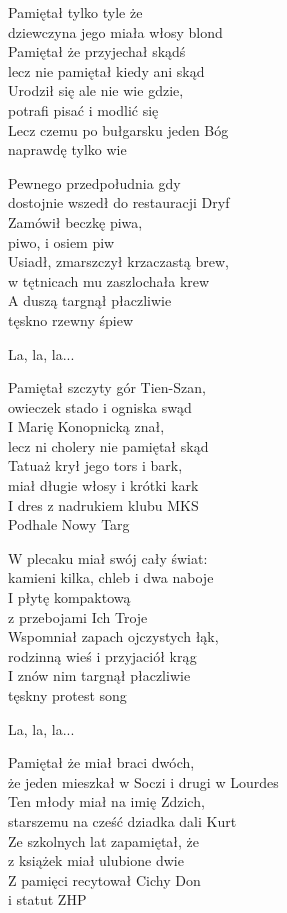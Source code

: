\begin{text}
   Pamiętał tylko tyle że\\
   dziewczyna jego miała włosy blond\\
   Pamiętał że przyjechał skądś\\
   lecz nie pamiętał kiedy ani skąd\\
   Urodził się ale nie wie gdzie,\\
   potrafi pisać i modlić się\\
   Lecz czemu po bułgarsku jeden Bóg\\
   naprawdę tylko wie
    
   Pewnego przedpołudnia gdy\\
   dostojnie wszedł do restauracji Dryf\\
   Zamówił beczkę piwa,\\
   piwo, i osiem piw\\
   Usiadł, zmarszczył krzaczastą brew,\\
   w tętnicach mu zaszlochała krew\\
   A duszą targnął płaczliwie\\
   tęskno rzewny śpiew
    
   \vin La, la, la...

   Pamiętał szczyty gór Tien-Szan,\\
   owieczek stado i ogniska swąd\\
   I Marię Konopnicką znał,\\
   lecz ni cholery nie pamiętał skąd\\
   Tatuaż krył jego tors i bark,\\
   miał długie włosy i krótki kark\\
   I dres z nadrukiem klubu MKS\\
   Podhale Nowy Targ

   W plecaku miał swój cały świat:\\
   kamieni kilka, chleb i dwa naboje\\
   I płytę kompaktową\\
   z przebojami Ich Troje\\
   Wspomniał zapach ojczystych łąk,\\
   rodzinną wieś i przyjaciół krąg\\
   I znów nim targnął płaczliwie\\
   tęskny protest song

   \vin La, la, la...

   Pamiętał że miał braci dwóch,\\
   że jeden mieszkał w Soczi i drugi w Lourdes\\
   Ten młody miał na imię Zdzich,\\
   starszemu na cześć dziadka dali Kurt\\
   Ze szkolnych lat zapamiętał, że\\
   z książek miał ulubione dwie\\
   Z pamięci recytował Cichy Don\\
   i statut ZHP
    

\end{text}
